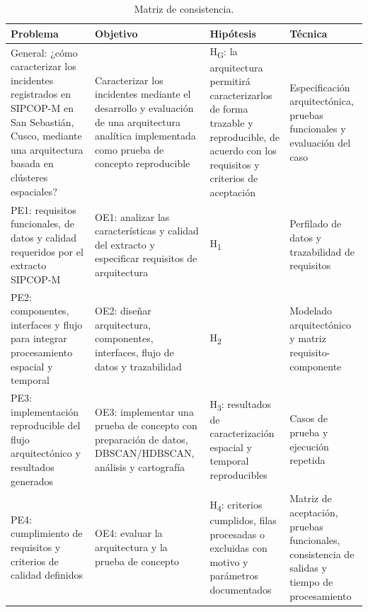 \label{anx:matriz}

\begin{table}[H]
\centering
\caption{Matriz de consistencia.}
\label{tab:consistencia}
\begingroup\singlespacing\footnotesize
\begin{tabular}{@{}p{3.4cm}p{3.7cm}p{3.7cm}p{3.3cm}@{}}
\toprule
\textbf{Problema} & \textbf{Objetivo} & \textbf{Hipótesis} & \textbf{Técnica} \\
\midrule
General: ¿cómo caracterizar los incidentes registrados en SIPCOP-M en San Sebastián, Cusco, mediante una arquitectura basada en clústeres espaciales? & Caracterizar los incidentes mediante el desarrollo y evaluación de una arquitectura analítica implementada como prueba de concepto reproducible & H\textsubscript{G}: la arquitectura permitirá caracterizarlos de forma trazable y reproducible, de acuerdo con los requisitos y criterios de aceptación & Especificación arquitectónica, pruebas funcionales y evaluación del caso \\
\addlinespace
PE1: requisitos funcionales, de datos y calidad requeridos por el extracto SIPCOP-M & OE1: analizar las características y calidad del extracto y especificar requisitos de arquitectura & H\textsubscript{1} & Perfilado de datos y trazabilidad de requisitos \\
\addlinespace
PE2: componentes, interfaces y flujo para integrar procesamiento espacial y temporal & OE2: diseñar arquitectura, componentes, interfaces, flujo de datos y trazabilidad & H\textsubscript{2} & Modelado arquitectónico y matriz requisito-componente \\
\addlinespace
PE3: implementación reproducible del flujo arquitectónico y resultados generados & OE3: implementar una prueba de concepto con preparación de datos, DBSCAN/HDBSCAN, análisis y cartografía & H\textsubscript{3}: resultados de caracterización espacial y temporal reproducibles & Casos de prueba y ejecución repetida \\
\addlinespace
PE4: cumplimiento de requisitos y criterios de calidad definidos & OE4: evaluar la arquitectura y la prueba de concepto & H\textsubscript{4}: criterios cumplidos, filas procesadas o excluidas con motivo y parámetros documentados & Matriz de aceptación, pruebas funcionales, consistencia de salidas y tiempo de procesamiento \\
\bottomrule
\end{tabular}
\endgroup
{}
\end{table}

